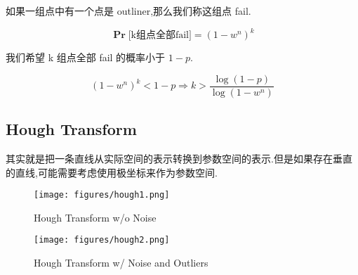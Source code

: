 如果一组点中有一个点是 outliner,那么我们称这组点 fail.

\begin{equation}
\mathbf{\Pr}\text{[k组点全部fail]} = {(1-w^n)}^k
\end{equation}

我们希望 k 组点全部 fail 的概率小于 $1-p$.

\begin{equation}
{(1-w^{n})}^k < 1-p
\Rightarrow
k > \frac{\log(1-p)}{\log(1-w^n)}
\end{equation}

\subsection{Hough Transform}

其实就是把一条直线从实际空间的表示转换到参数空间的表示.但是如果存在垂直的直线,可能需要考虑使用极坐标来作为参数空间.

\begin{figure}[htbp]
    \centering
    \texttt{[image: figures/hough1.png]}
    \caption{Hough Transform w/o Noise}
\end{figure}

\begin{figure}[htbp]
    \centering
    \texttt{[image: figures/hough2.png]}
    \caption{Hough Transform w/ Noise and Outliers}
\end{figure}